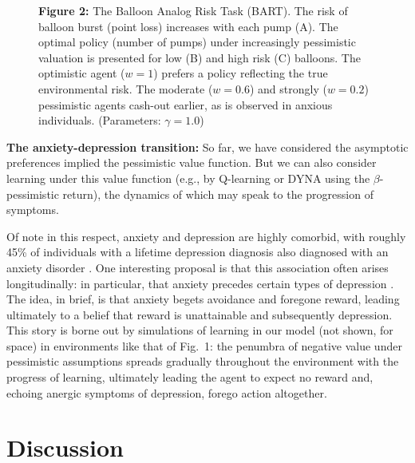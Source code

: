 \documentclass[11pt]{article} %
\begin{document}
\begin{figure}
  \centerline{%
  }
  \par \textbf{Figure 2:} The Balloon Analog Risk Task (BART). The risk of balloon burst (point loss) increases with each pump (A). The optimal policy (number of pumps) under increasingly pessimistic valuation is presented for low (B) and high risk (C) balloons. The optimistic agent ($w=1$) prefers a policy reflecting the true environmental risk. The moderate ($w=0.6$) and strongly ($w=0.2$) pessimistic agents cash-out earlier, as is observed in anxious individuals. (Parameters: $\gamma = 1.0$)
\end{figure}

\textbf{The anxiety-depression transition:} So far, we have considered the asymptotic preferences implied the pessimistic value function. But we can also consider learning under this value function (e.g., by Q-learning or DYNA using the $\beta$-pessimistic return), the dynamics of which may speak to the progression of symptoms. 

Of note in this respect, anxiety and depression are highly comorbid, with roughly 45\% of individuals with a lifetime depression diagnosis also diagnosed with an anxiety disorder \citep{kessler2015}. One interesting proposal is that this association often arises longitudinally: in particular, that anxiety precedes certain types of depression \citep{alloy1990, jacobson2014}. The idea, in brief, is that anxiety begets avoidance and foregone reward, leading ultimately to a belief that reward is unattainable and subsequently depression. This story is borne out by simulations of learning in our model (not shown, for space) in environments like that of Fig.~1: the penumbra of negative value under pessimistic assumptions spreads gradually throughout the environment with the progress of learning, ultimately leading the agent to expect no reward and, echoing anergic symptoms of depression, forego action altogether.

\section{Discussion}
\end{document}
